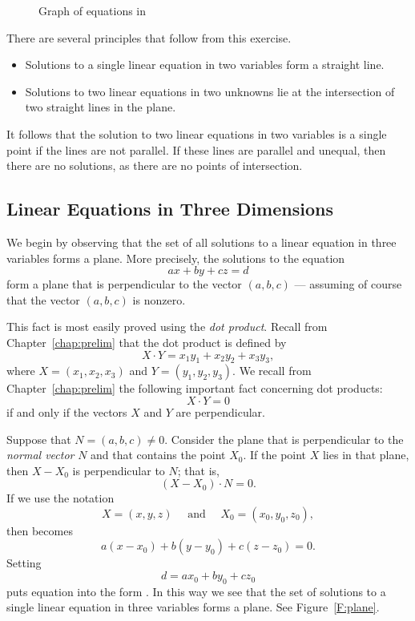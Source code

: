 \begin{figure}[htb]
                       \centerline{%
                       }
                       \caption{Graph of equations in \protect{}}
                       \label{lineint}
\end{figure}


There are several principles that follow from this exercise.
\begin{itemize}
\item   Solutions to a single linear equation in two variables
form a straight line.
\item Solutions to two linear equations in two unknowns lie at
the intersection of two straight lines in the plane.
\end{itemize}
It follows that the solution to two linear equations in two
variables is a single point if the lines are not parallel.  If
these lines are parallel and unequal, then there are no
solutions, as there are no points of intersection.

\subsection*{Linear Equations in Three Dimensions}

We begin by observing that the set of all solutions to a linear
equation in three variables forms a plane.  More
precisely, the solutions to the equation
\begin{equation} \label{abcd}
ax+by+cz=d
\end{equation}
form a plane that is perpendicular to the vector $(a,b,c)$ ---
assuming of course that the vector $(a,b,c)$ is nonzero.

This fact is most easily proved using the {\em dot product\/}.
Recall from Chapter~\ref{chap:prelim}  that
the dot product is defined by
\[
X\cdot Y = x_1y_1+x_2y_2+x_3y_3,
\]
where $X=(x_1,x_2,x_3)$ and $Y=(y_1,y_2,y_3)$.  We recall from
Chapter~\ref{chap:prelim}  the following important
fact concerning dot products:
\[
X\cdot Y = 0
\]
if and only if the vectors $X$ and $Y$ are perpendicular.

Suppose that $N=(a,b,c)\neq 0$.  Consider the plane that is perpendicular
to the {\em normal vector\/} $N$ and that contains the
point $X_0$.  If the point $X$ lies in that plane, then $X-X_0$ is
perpendicular to $N$; that is,
\begin{equation} \label{XX_0}
(X-X_0)\cdot N = 0.
\end{equation}
If we use the notation
\[
X=(x,y,z) \quad \mbox{ and } \quad X_0=(x_0,y_0,z_0),
\]
then  becomes
\[
a(x-x_0)+b(y-y_0)+c(z-z_0)=0.
\]
Setting
\[
d=ax_0 + by_0 + cz_0
\]
puts equation  into the form .  In this way
we see that the set of solutions to a single linear equation in
three variables forms a plane.  See Figure~\ref{F:plane}.

